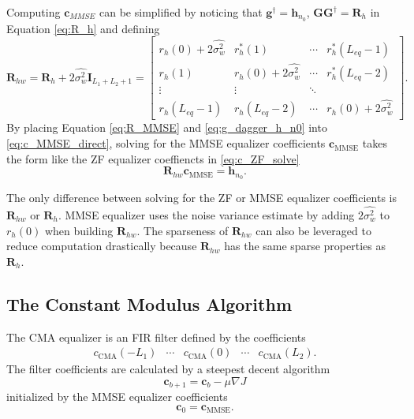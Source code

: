 Computing $\mathbf{c}_{MMSE}$ can be simplified by noticing that $\mathbf{g}^\dagger = \mathbf{h}_{n_0}$, $\mathbf{G}\mathbf{G}^\dagger = \mathbf{R}_h$ in Equation \eqref{eq:R_h} and defining
\begin{equation}
\mathbf{R}_{hw} = 
\mathbf{R}_h + 2\hat{\sigma^2_w} \mathbf{I}_{L_1+L_2+1} = 
		\begin{bmatrix}
		r_{h}(0) + 2\hat{\sigma^2_w}	& r^\ast_{h}(1)							& \cdots 	& r^\ast_{h}(L_{eq}-1)  	\\
		r_{h}(1) 						& r_{h}(0) + 2\hat{\sigma^2_w}& \cdots 	& r^\ast_{h}(L_{eq}-2)  				\\
		\vdots	 						& \vdots								& \ddots 	&  							\\
		r_{h}(L_{eq}-1)					& r_{h}(L_{eq}-2)						& \cdots	& r_{h}(0) + 2\hat{\sigma^2_w}  			
	\end{bmatrix}.
	\label{eq:R_MMSE}
\end{equation}
By placing Equation \eqref{eq:R_MMSE} and \eqref{eq:g_dagger_h_n0} into \eqref{eq:c_MMSE_direct}, solving for the MMSE equalizer coefficients $\mathbf{c}_\text{MMSE}$ takes the form like the ZF equalizer coeffiencts in \eqref{eq:c_ZF_solve}
\begin{equation}
\mathbf{R}_{hw}\mathbf{c}_\text{MMSE} = \mathbf{h}_{n_0}.
\label{eq:c_MMSE_solve}
\end{equation}


The only difference between solving for the ZF or MMSE equalizer coefficients is $\mathbf{R}_{hw}$ or $\mathbf{R}_{h}$. 
MMSE equalizer uses the noise variance estimate by adding $2\hat{\sigma^2_w}$ to $r_h(0)$ when building $\mathbf{R}_{hw}$.
The sparseness of $\mathbf{R}_{hw}$ can also be leveraged to reduce computation drastically because
$\mathbf{R}_{hw}$ has the same sparse properties as $\mathbf{R}_{h}$.

\subsection{The Constant Modulus Algorithm}
The CMA equalizer is an FIR filter defined by the coefficients
\begin{equation}
\begin{matrix}
c_\text{CMA}(-L_1) & \cdots & c_\text{CMA}(0) & \cdots & c_\text{CMA}(L_2).
\end{matrix}
\end{equation}
The filter coefficients are calculated by a steepest decent algorithm 
\begin{equation}
\mathbf{c}_{b+1} = \mathbf{c}_{b}-\mu \nabla J
\label{eq:steepest}
\end{equation}
initialized by the MMSE equalizer coefficients
\begin{equation}
\mathbf{c}_{0} = \mathbf{c}_\text{MMSE}.
\end{equation}

